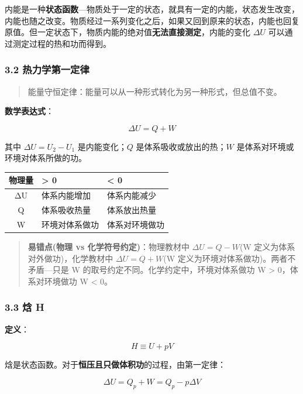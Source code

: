 \documentclass[a4paper,11pt]{ctexart}
\newcounter{none}
\newcommand{\箭}{\ensuremath{\rightarrow}}
\newcommand{\左箭}{\ensuremath{\leftarrow}}
\newcommand{\上箭}{\ensuremath{\uparrow}}
\newcommand{\下箭}{\ensuremath{\downarrow}}
\newcommand{\衡}{\ensuremath{\rightleftharpoons}}
\newcommand{\双箭}{\ensuremath{\leftrightarrow}}
\newcommand{\约等于}{\ensuremath{\approx}}
\newcommand{\小于等于}{\ensuremath{\leq}}
\newcommand{\大于等于}{\ensuremath{\geq}}
\newcommand{\不等于}{\ensuremath{\neq}}
\newcommand{\西格马}{\ensuremath{\sigma}}
\newcommand{\派}{\ensuremath{\pi}}
\begin{document}
内能是一种\textbf{状态函数}---物质处于一定的状态，就具有一定的内能，状态发生改变，内能也随之改变。物质经过一系列变化之后，如果又回到原来的状态，内能也回复原值。但一定状态下，物质内能的绝对值\textbf{无法直接测定}，内能的变化 \(\Delta U\) 可以通过测定过程的热和功而得到。

\subsubsection{3.2 热力学第一定律}\label{ux70edux529bux5b66ux7b2cux4e00ux5b9aux5f8b}

\begin{quote}
能量守恒定律：能量可以从一种形式转化为另一种形式，但总值不变。
\end{quote}

\textbf{数学表达式}：

\[
\Delta U = Q + W
\]

其中 \(\Delta U = U_2 - U_1\) 是内能变化；\(Q\) 是体系吸收或放出的热；\(W\) 是体系对环境或环境对体系所做的功。

{\def\LTcaptype{none} %
\begin{longtable}[]{@{}cll@{}}
\toprule\noalign{}
物理量 & \textgreater{} 0 & \textless{} 0 \\
\midrule\noalign{}
\endhead
\bottomrule\noalign{}
\endlastfoot
ΔU & 体系内能增加 & 体系内能减少 \\
Q & 体系吸收热量 & 体系放出热量 \\
W & 环境对体系做功 & 体系对环境做功 \\
\end{longtable}
}

\begin{quote}
\textbf{易错点(物理 vs 化学符号约定)}：物理教材中 \(\Delta U = Q - W\)(W 定义为体系对外做功)，化学教材中 \(\Delta U = Q + W\)(W 定义为环境对体系做功)。两者不矛盾---只是 W 的取号约定不同。化学约定中，环境对体系做功 W \textgreater{} 0，体系对环境做功 W \textless{} 0。
\end{quote}

\subsubsection{3.3 焓 H}\label{ux7113-h}

\textbf{定义}：

\[
H \equiv U + pV
\]

焓是状态函数。对于\textbf{恒压且只做体积功}的过程，由第一定律：

\[
\Delta U = Q_p + W = Q_p - p\Delta V
\]
\end{document}
